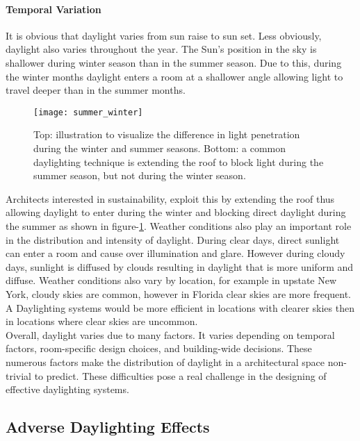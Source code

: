     \paragraph{Temporal Variation} 

    It is obvious that daylight varies from sun raise to sun set.
    Less obviously, daylight also varies throughout the year.
    The Sun's position in the sky is shallower during winter season than in the summer season. 
    Due to this, during the winter months daylight enters a room at a shallower angle allowing light to travel deeper than in the summer months.

    \begin{figure}[h]
    \centering
    \texttt{[image: summer\_winter]}
    \caption{Top: illustration to visualize the difference in light penetration during the winter and summer seasons. Bottom: a common daylighting technique is extending the roof to block light during the summer season, but not during the winter season.}
    \label{fig:summer_winter}
    \end{figure}

    Architects interested in sustainability, exploit this by extending the roof thus allowing daylight to enter during the winter and blocking direct daylight during the summer as shown in figure-\ref{fig:summer_winter}.
    Weather conditions also play an important role in the distribution and intensity of daylight. 
    During clear days, direct sunlight can enter a room and cause over illumination and glare.
    However during cloudy days, sunlight is diffused by clouds resulting in daylight that is more uniform and diffuse.
    Weather conditions also vary by location, for example in upstate New York, cloudy skies are common, however in Florida clear skies are more frequent.
    A Daylighting systems would be more efficient in locations with clearer skies then in locations where clear skies are uncommon.\\

    Overall, daylight varies due to many factors. It varies depending on temporal factors, room-specific design choices, and building-wide decisions. These numerous factors make the distribution of daylight in a architectural space non-trivial to predict. 
    These difficulties pose a real challenge in the designing of effective daylighting systems.

  \subsection{Adverse Daylighting Effects}

